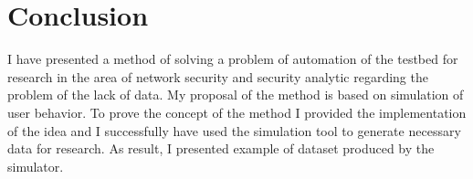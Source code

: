 
\section{Conclusion}

I have presented a method of solving a problem of automation of the testbed for research in the area of network security and security analytic regarding the problem of the lack of data. My proposal of the method is based on simulation of user behavior. To prove the concept of the method I provided the implementation of the idea and I successfully have used the simulation tool to generate necessary data for research. As result, I presented example of dataset produced by the simulator.